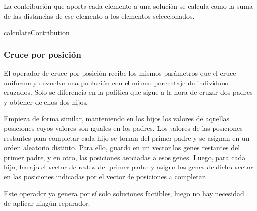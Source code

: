 \documentclass[10pt,a4paper]{article}
\begin{document}
La contribución que aporta cada elemento a una solución se calcula como la suma de las distancias de ese elemento a los elementos seleccionados.\\

\begin{algorithm}[H]
	\caption{calculateContribution}
\end{algorithm}


\subsubsection{Cruce por posición}

El operador de cruce por posición recibe los mismos parámetros que el cruce uniforme y devuelve una población con el mismo porcentaje de individuos cruzados. Solo se diferencia en la política que sigue a la hora de cruzar dos padres y obtener de ellos dos hijos.

Empieza de forma similar, manteniendo en los hijos los valores de aquellas posiciones cuyos valores son iguales en los padres. Los valores de las posiciones restantes para completar cada hijo se toman del primer padre y se asignan en un orden aleatorio distinto. Para ello, guardo en un vector los genes restantes del primer padre, y en otro, las posiciones asociadas a esos genes. Luego, para cada hijo, barajo el vector de restos del primer padre y asigno los genes de dicho vector en las posiciones indicadas por el vector de posiciones a completar.

Este operador ya genera por sí solo soluciones factibles, luego no hay necesidad de aplicar ningún reparador.\\
\end{document}
